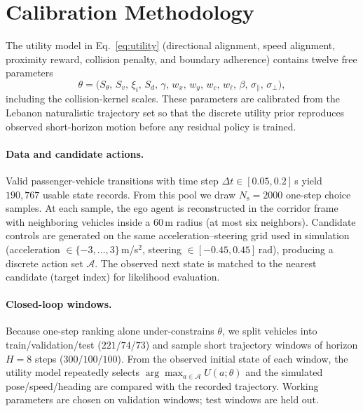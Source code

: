 \documentclass[conference]{IEEEtran}
\begin{document}
\section{Calibration Methodology}
\label{sec:calibration_methodology}

The utility model in Eq.~\eqref{eq:utility} (directional alignment, speed alignment, proximity reward, collision penalty, and boundary adherence) contains twelve free parameters
\[
\theta=\bigl(S_\theta,\,S_v,\,\xi_i,\,S_d,\,\gamma,\,w_x,\,w_y,\,w_c,\,w_\ell,\,\beta,\,\sigma_{\parallel},\,\sigma_{\perp}\bigr),
\]
including the collision-kernel scales. These parameters are calibrated from the Lebanon naturalistic trajectory set so that the discrete utility prior reproduces observed short-horizon motion before any residual policy is trained.

\paragraph{Data and candidate actions.}
Valid passenger-vehicle transitions with time step $\Delta t\in[0.05,0.2]$\,s yield $190{,}767$ usable state records. From this pool we draw $N_{\mathrm{s}}=2000$ one-step choice samples. At each sample, the ego agent is reconstructed in the corridor frame with neighboring vehicles inside a $60$\,m radius (at most six neighbors). Candidate controls are generated on the same acceleration--steering grid used in simulation
(acceleration $\in\{-3,\ldots,3\}$\,m/s$^2$, steering $\in[-0.45,0.45]$\,rad), producing a discrete action set $\mathcal{A}$. The observed next state is matched to the nearest candidate (target index) for likelihood evaluation.

\paragraph{Closed-loop windows.}
Because one-step ranking alone under-constrains $\theta$, we split vehicles into train/validation/test ($221$/$74$/$73$) and sample short trajectory windows of horizon $H=8$ steps ($300$/$100$/$100$). From the observed initial state of each window, the utility model repeatedly selects $\arg\max_{a\in\mathcal{A}} U(a;\theta)$ and the simulated pose/speed/heading are compared with the recorded trajectory. Working parameters are chosen on validation windows; test windows are held out.
\end{document}
